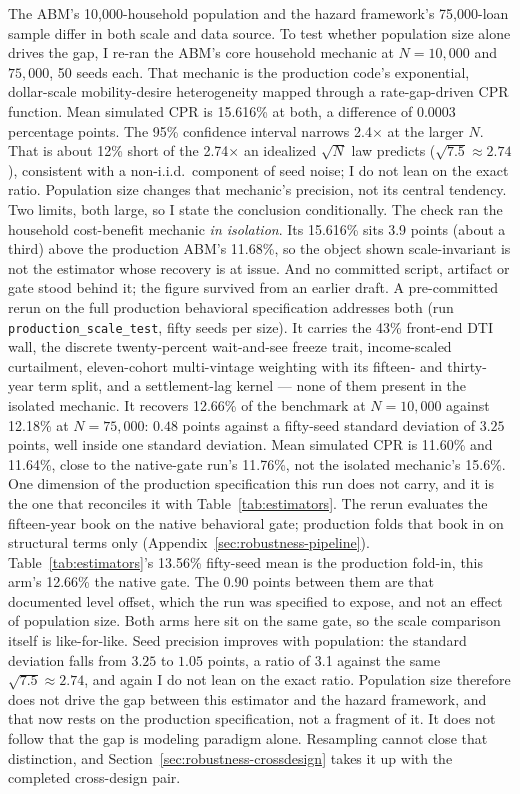 \documentclass[12pt]{article}
\begin{document}
The ABM's 10,000-household population and the hazard framework's 75,000-loan sample differ in both scale and data source. To test whether population size alone drives the gap, I re-ran the ABM's core household mechanic at $N = 10{,}000$ and $75{,}000$, 50 seeds each. That mechanic is the production code's exponential, dollar-scale mobility-desire heterogeneity mapped through a rate-gap-driven CPR function. Mean simulated CPR is 15.616\% at both, a difference of 0.0003 percentage points. The 95\% confidence interval narrows 2.4$\times$ at the larger $N$. That is about 12\% short of the 2.74$\times$ an idealized $\sqrt{N}$ law predicts ($\sqrt{7.5} \approx 2.74$), consistent with a non-i.i.d.\ component of seed noise; I do not lean on the exact ratio. Population size changes that mechanic's precision, not its central tendency. Two limits, both large, so I state the conclusion conditionally. The check ran the household cost-benefit mechanic \emph{in isolation}. Its 15.616\% sits 3.9 points (about a third) above the production ABM's 11.68\%, so the object shown scale-invariant is not the estimator whose recovery is at issue. And no committed script, artifact or gate stood behind it; the figure survived from an earlier draft. A pre-committed rerun on the full production behavioral specification addresses both (run \texttt{production\_scale\_test}, fifty seeds per size). It carries the 43\% front-end DTI wall, the discrete twenty-percent wait-and-see freeze trait, income-scaled curtailment, eleven-cohort multi-vintage weighting with its fifteen- and thirty-year term split, and a settlement-lag kernel --- none of them present in the isolated mechanic. It recovers 12.66\% of the benchmark at $N = 10{,}000$ against 12.18\% at $N = 75{,}000$: $0.48$ points against a fifty-seed standard deviation of $3.25$ points, well inside one standard deviation. Mean simulated CPR is 11.60\% and 11.64\%, close to the native-gate run's 11.76\%, not the isolated mechanic's 15.6\%. One dimension of the production specification this run does not carry, and it is the one that reconciles it with Table~\ref{tab:estimators}. The rerun evaluates the fifteen-year book on the native behavioral gate; production folds that book in on structural terms only (Appendix~\ref{sec:robustness-pipeline}). Table~\ref{tab:estimators}'s 13.56\% fifty-seed mean is the production fold-in, this arm's 12.66\% the native gate. The 0.90 points between them are that documented level offset, which the run was specified to expose, and not an effect of population size. Both arms here sit on the same gate, so the scale comparison itself is like-for-like. Seed precision improves with population: the standard deviation falls from $3.25$ to $1.05$ points, a ratio of 3.1 against the same $\sqrt{7.5} \approx 2.74$, and again I do not lean on the exact ratio. Population size therefore does not drive the gap between this estimator and the hazard framework, and that now rests on the production specification, not a fragment of it. It does not follow that the gap is modeling paradigm alone. Resampling cannot close that distinction, and Section~\ref{sec:robustness-crossdesign} takes it up with the completed cross-design pair.
\end{document}

